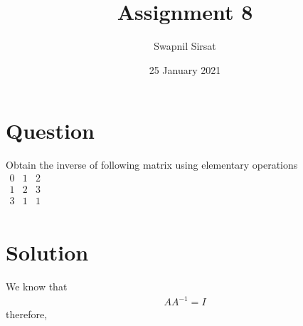 \documentclass{article}
\title{Assignment 8}
\author{Swapnil Sirsat}
\date{25 January 2021}
\begin{document}
\maketitle

\section{Question}
Obtain the inverse of following matrix using elementary operations\\
$\begin{matrix}
0 & 1 & 2\\
1 & 2 & 3\\
3 & 1 & 1\\
\end{matrix}$
\section{Solution}
We know that
\begin{gather*}
    AA^{-1} = I
\end{gather*}
therefore,
\end{document}
